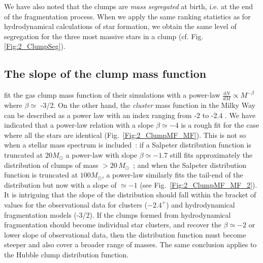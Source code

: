 We have also noted that the clumps are {\it mass segregated} at birth, i.e. at the end of the fragmentation process. When we apply the same ranking statistics as for hydrodynamical calculations of star formation, we obtain the same level of segregation for the three most massive stars in a clump (cf. Fig. \ref{Fig:2_ClumpSeg}). %

\subsection*{The slope of the clump mass function}

\cite{Klessen2000,Klessen2001} fit the gas clump mass function of their simulations with a power-law $\frac{dN}{dM} \propto M^{-\beta}$ where $\beta \simeq$ -3/2. On the other hand, the \textit{cluster} mass function in the Milky Way can be described as a power law with an index ranging from -2 to -2.4 \citep{Haas2010}. We have indicated that a power-law relation with a slope $ \beta \simeq -4$ is a rough fit for the case where all the stars are identical (Fig.~\ref{Fig:2_ClumpMF_MF}). This is not so  when a stellar mass spectrum is included~: if a Salpeter distribution function is truncated at $20 M_\odot$ a power-law with slope $ \beta \simeq -1.7$ still fits approximately the distribution of clumps of  mass $ > 20\, M_\odot$~; and when the Salpeter distribution function is truncated at $100 M_\odot$, a power-law similarly fits the tail-end of the distribution but now with a slope of $\simeq -1$ (see Fig.~\ref{Fig:2_ClumpMF_MF_2}). It is intriguing that the slope of the distribution should fall within the bracket of values for the observational data for clusters ($-2.4^+$) and hydrodynamical fragmentation models (-3/2). If the clumps formed from hydrodynamical fragmentation should become individual star clusters, and recover the $\beta \simeq -2 $ or lower slope of observational data, then the distribution function must become steeper and also cover a broader range of masses. The same conclusion applies to the Hubble clump distribution function.


